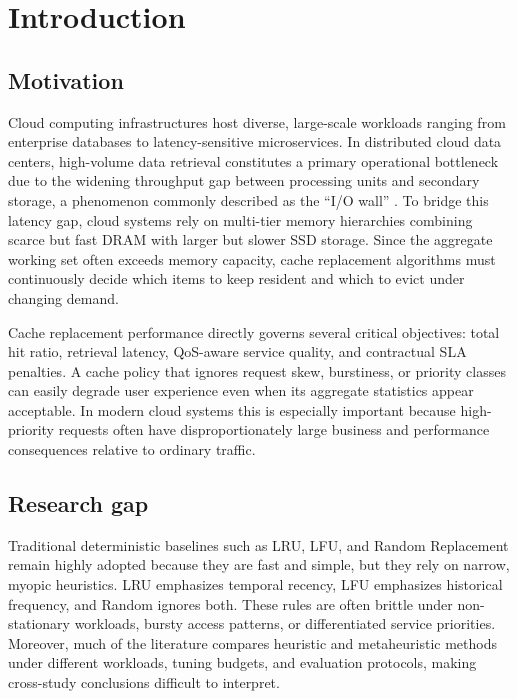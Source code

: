\documentclass[10pt,journal,compsoc]{IEEEtran}
\begin{document}
\maketitle
\IEEEdisplaynontitleabstractindextext
\IEEEpeerreviewmaketitle

\section{Introduction}
\subsection{Motivation}
Cloud computing infrastructures host diverse, large-scale workloads ranging from enterprise databases to latency-sensitive microservices. In distributed cloud data centers, high-volume data retrieval constitutes a primary operational bottleneck due to the widening throughput gap between processing units and secondary storage, a phenomenon commonly described as the ``I/O wall'' \cite{ait2025qmarc}. To bridge this latency gap, cloud systems rely on multi-tier memory hierarchies combining scarce but fast DRAM with larger but slower SSD storage. Since the aggregate working set often exceeds memory capacity, cache replacement algorithms must continuously decide which items to keep resident and which to evict under changing demand.

Cache replacement performance directly governs several critical objectives: total hit ratio, retrieval latency, QoS-aware service quality, and contractual SLA penalties. A cache policy that ignores request skew, burstiness, or priority classes can easily degrade user experience even when its aggregate statistics appear acceptable. In modern cloud systems this is especially important because high-priority requests often have disproportionately large business and performance consequences relative to ordinary traffic.

\subsection{Research gap}
Traditional deterministic baselines such as LRU, LFU, and Random Replacement remain highly adopted because they are fast and simple, but they rely on narrow, myopic heuristics. LRU emphasizes temporal recency, LFU emphasizes historical frequency, and Random ignores both. These rules are often brittle under non-stationary workloads, bursty access patterns, or differentiated service priorities. Moreover, much of the literature compares heuristic and metaheuristic methods under different workloads, tuning budgets, and evaluation protocols, making cross-study conclusions difficult to interpret.
\end{document}
